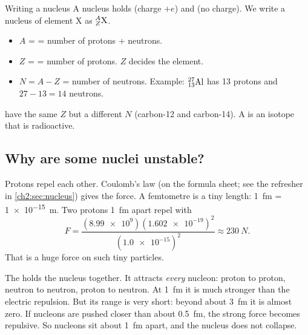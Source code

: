 \begin{keywords}
\end{keywords}

\begin{refresher}{Writing a nucleus}
A nucleus holds  (charge $+e$) and  (no charge). We write
a nucleus of element X as $\chFourNuc{A}{Z}{X}$.
\begin{itemize}
  \item $A$ =  = number of protons + neutrons.
  \item $Z$ =  = number of protons. $Z$ decides the element.
  \item $N = A - Z$ = number of neutrons. Example: $\chFourNuc{27}{13}{Al}$ has
        13 protons and $27 - 13 = 14$ neutrons.
\end{itemize}
 have the same $Z$ but a different $N$ (carbon-12 and carbon-14).
A  is an isotope that is radioactive.
\end{refresher}

\subsection{Why are some nuclei unstable?}

Protons repel each other. Coulomb's law (on the formula sheet; see the refresher in
\cref{ch2:sec:nucleus}) gives the force. A femtometre is a tiny length:
\qty{1}{fm} = \qty{1e-15}{m}. Two protons \qty{1}{fm} apart repel with
\[
  F = \frac{(\num{8.99e9})(\num{1.602e-19})^2}{(\num{1.0e-15})^2} \approx \qty{230}{N}.
\]
That is a huge force on such tiny particles.

The  holds the nucleus together. It attracts \emph{every}
nucleon: proton to proton, neutron to neutron, proton to neutron. At \qty{1}{fm} it
is much stronger than the electric repulsion. But its range is very short: beyond
about \qty{3}{fm} it is almost zero. If nucleons are pushed closer than about
\qty{0.5}{fm}, the strong force becomes repulsive. So nucleons sit about \qty{1}{fm}
apart, and the nucleus does not collapse.

